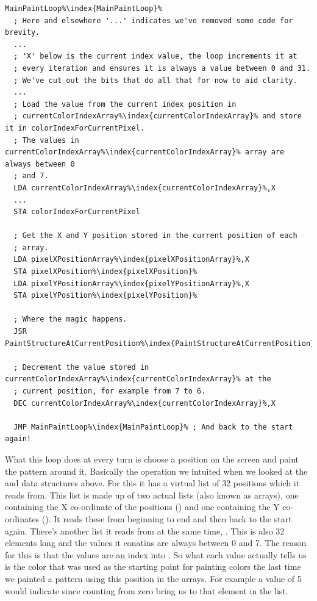 \begin{lstlisting}[escapechar=\%]
MainPaintLoop%\index{MainPaintLoop}%   
  ; Here and elsewhere '...' indicates we've removed some code for brevity.
  ... 
  ; 'X' below is the current index value, the loop increments it at
  ; every iteration and ensures it is always a value between 0 and 31. 
  ; We've cut out the bits that do all that for now to aid clarity.
  ...
  ; Load the value from the current index position in
  ; currentColorIndexArray%\index{currentColorIndexArray}% and store it in colorIndexForCurrentPixel.
  ; The values in currentColorIndexArray%\index{currentColorIndexArray}% array are always between 0 
  ; and 7. 
  LDA currentColorIndexArray%\index{currentColorIndexArray}%,X
  ...
  STA colorIndexForCurrentPixel

  ; Get the X and Y position stored in the current position of each
  ; array.
  LDA pixelXPositionArray%\index{pixelXPositionArray}%,X
  STA pixelXPosition%\index{pixelXPosition}%
  LDA pixelYPositionArray%\index{pixelYPositionArray}%,X
  STA pixelYPosition%\index{pixelYPosition}%

  ; Where the magic happens.
  JSR PaintStructureAtCurrentPosition%\index{PaintStructureAtCurrentPosition}%

  ; Decrement the value stored in currentColorIndexArray%\index{currentColorIndexArray}% at the
  ; current position, for example from 7 to 6.
  DEC currentColorIndexArray%\index{currentColorIndexArray}%,X

  JMP MainPaintLoop%\index{MainPaintLoop}% ; And back to the start again!
\end{lstlisting}

What this loop does at every turn is choose a position on the screen and paint the pattern around it. Basically the operation we intuited
when we looked at the  and  data structures above. For this it has a virtual list of
32 positions which it reads from. This list is made up of two actual lists (also known as arrays), one containing the X co-ordinate
of the positions () and one containing the Y co-ordinates (). It reads these
from beginning to end and then back to the start again. There's another list it reads from at the same time, .
This is also 32 elements long and the values it conatins are always between 0 and 7. The reason for this is that the values
are an index into . So
what each value actually tells us is the color that was used as the starting point for painting colors the last time we painted a pattern
using this position in the arrays. For example a value of 5 would indicate  since counting from zero bring us to that element
in the list.

